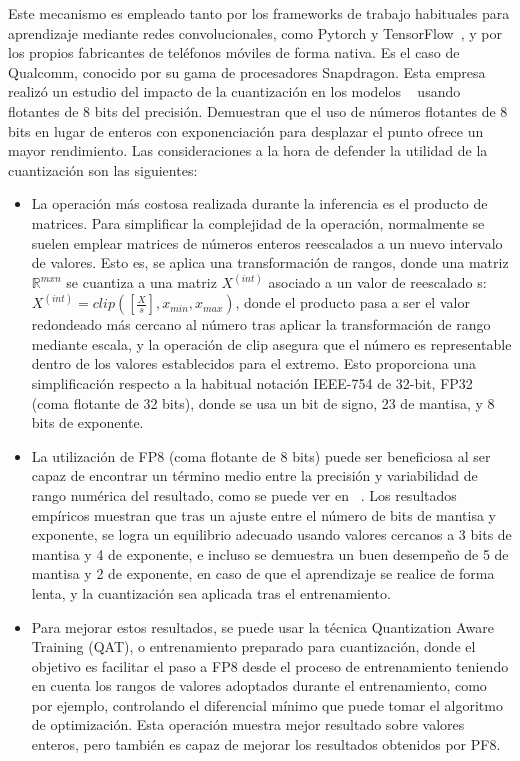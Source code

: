 Este mecanismo es empleado tanto por los frameworks de trabajo habituales para aprendizaje mediante redes convolucionales, como Pytorch \cite{paszke2019pytorch} y TensorFlow~\cite{tensorflow2015-whitepaper}, y por los propios fabricantes de teléfonos móviles de forma nativa. Es el caso de Qualcomm, conocido por su gama de procesadores Snapdragon. Esta empresa realizó un estudio del impacto de la cuantización en los modelos ~\cite{kuzmin2024fp8} usando flotantes de 8 bits del precisión. Demuestran que el uso de números flotantes de 8 bits en lugar de enteros con exponenciación para desplazar el punto ofrece un mayor rendimiento. Las consideraciones a la hora de defender la utilidad de la cuantización son las siguientes:

\begin{itemize}
	\item La operación más costosa realizada durante la inferencia es el producto de matrices. Para simplificar la complejidad de la operación, normalmente se suelen emplear matrices de números enteros reescalados a un nuevo intervalo de valores. Esto es, se aplica una transformación de rangos, donde una matriz $\mathbb{R}^{m x n}$ se cuantiza a una matriz $X^{(int)}$ asociado a un valor de reescalado s: $X^{(int)}=clip([\frac{X}{s}],x_{min},x_{max})$, donde el producto pasa a ser el valor redondeado más cercano al número tras aplicar la transformación de rango mediante escala, y la operación de clip asegura que el número es representable dentro de los valores establecidos para el extremo. Esto proporciona una simplificación respecto a la habitual notación IEEE-754 de 32-bit, FP32 (coma flotante de 32 bits), donde se usa un bit de signo, 23 de mantisa, y 8 bits de exponente.
	\item  La utilización de FP8 (coma flotante de 8 bits) puede ser beneficiosa al ser capaz de encontrar un término medio entre la precisión y variabilidad de rango numérica del resultado, como se puede ver en ~\cite{kuzmin2024fp8}. Los resultados empíricos muestran que tras un ajuste entre el número de bits de mantisa y exponente, se logra un equilibrio adecuado usando valores cercanos a 3 bits de mantisa y 4 de exponente, e incluso se demuestra un buen desempeño de 5 de mantisa y 2 de exponente, en caso de que el aprendizaje se realice de forma lenta, y la cuantización sea aplicada tras el entrenamiento.
	\item Para mejorar estos resultados, se puede usar la técnica Quantization Aware Training (QAT), o entrenamiento preparado para cuantización, donde el objetivo es facilitar el paso a FP8 desde el proceso de entrenamiento teniendo en cuenta los rangos de valores adoptados durante el entrenamiento, como por ejemplo, controlando el diferencial mínimo que puede tomar el algoritmo de optimización. Esta operación muestra mejor resultado sobre valores enteros, pero también es capaz de mejorar los resultados obtenidos por PF8.
\end{itemize}

